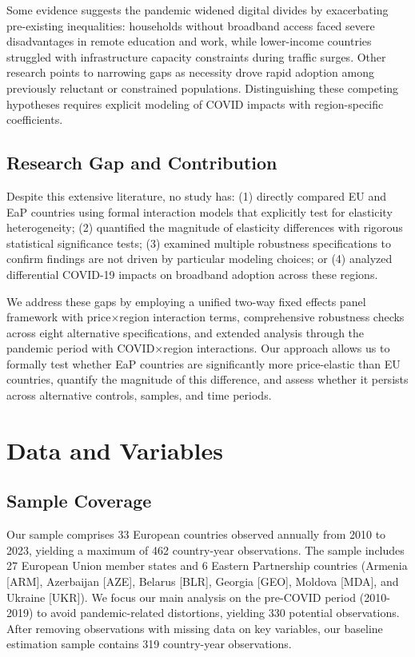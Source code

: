 \documentclass[12pt,review]{elsarticle}
\begin{document}
Some evidence suggests the pandemic widened digital divides by exacerbating pre-existing inequalities: households without broadband access faced severe disadvantages in remote education and work, while lower-income countries struggled with infrastructure capacity constraints during traffic surges. Other research points to narrowing gaps as necessity drove rapid adoption among previously reluctant or constrained populations. Distinguishing these competing hypotheses requires explicit modeling of COVID impacts with region-specific coefficients.

\subsection{Research Gap and Contribution}

Despite this extensive literature, no study has: (1) directly compared EU and EaP countries using formal interaction models that explicitly test for elasticity heterogeneity; (2) quantified the magnitude of elasticity differences with rigorous statistical significance tests; (3) examined multiple robustness specifications to confirm findings are not driven by particular modeling choices; or (4) analyzed differential COVID-19 impacts on broadband adoption across these regions.

We address these gaps by employing a unified two-way fixed effects panel framework with price$\times$region interaction terms, comprehensive robustness checks across eight alternative specifications, and extended analysis through the pandemic period with COVID$\times$region interactions. Our approach allows us to formally test whether EaP countries are significantly more price-elastic than EU countries, quantify the magnitude of this difference, and assess whether it persists across alternative controls, samples, and time periods.

\section{Data and Variables}
\label{sec:data}

\subsection{Sample Coverage}

Our sample comprises 33 European countries observed annually from 2010 to 2023, yielding a maximum of 462 country-year observations. The sample includes 27 European Union member states and 6 Eastern Partnership countries (Armenia [ARM], Azerbaijan [AZE], Belarus [BLR], Georgia [GEO], Moldova [MDA], and Ukraine [UKR]). We focus our main analysis on the pre-COVID period (2010-2019) to avoid pandemic-related distortions, yielding 330 potential observations. After removing observations with missing data on key variables, our baseline estimation sample contains 319 country-year observations.
\end{document}
